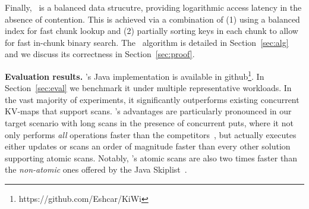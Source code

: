 Finally, \kiwi\ is a balanced data strucutre, providing logarithmic access latency in the absence of contention.
This is achieved via a combination of (1) using a balanced index for fast chunk lookup and (2) partially sorting keys in each
chunk to allow for fast in-chunk binary search. The \kiwi\ algorithm is detailed in Section~\ref{sec:alg}
and we discuss its correctness in Section~\ref{sec:proof}.


{\bf{Evaluation results.}}
\kiwi's Java implementation is available in github\footnote{https://github.com/Eshcar/KiWi}. In Section~\ref{sec:eval} we benchmark it under multiple representative workloads.
In the vast majority of  experiments, it significantly outperforms existing concurrent KV-maps that support scans.
\kiwi's advantages are particularly pronounced in our target scenario with long scans in the presence of concurrent puts, where
it not only performs \emph{all} operations faster than the competitors~\cite{BrownA12,BronsonCCO2010},
but actually executes either updates or scans an order of magnitude faster than every other solution supporting atomic scans.
Notably, \kiwi's atomic scans are also two times faster than the \emph{non-atomic}
ones offered by the Java Skiplist~\cite{JavaConcurrentSkipList}. 



